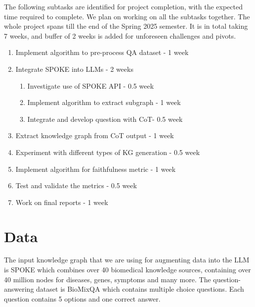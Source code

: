 \documentclass[11pt,a4paper]{article}
\begin{document}
The following subtasks are identified for project completion, with the expected time required to complete. We plan on working on all the subtasks together. The whole project spans till the end of the Spring 2025 semester. It is in total taking 7 weeks, and buffer of 2 weeks is added for unforeseen challenges and pivots. 
\begin{enumerate}
    \item Implement algorithm to pre-process QA dataset - 1 week
    \item Integrate SPOKE into LLMs - 2 weeks
    \begin{enumerate}
        \item Investigate use of SPOKE API - 0.5 week
        \item Implement algorithm to extract subgraph - 1 week
        \item Integrate and develop question with CoT- 0.5 week
    \end{enumerate}
    \item Extract knowledge graph from CoT output - 1 week
    \item Experiment with different types of KG generation - 0.5 week
    \item Implement algorithm for faithfulness metric - 1 week
    \item Test and validate the metrics - 0.5 week
    \item Work on final reports - 1 week
\end{enumerate}






\section{Data}
The input knowledge graph that we are using for augmenting data into the LLM is SPOKE which combines over 40 biomedical knowledge sources, containing over 40 million nodes for diseases, genes, symptoms and many more. The question-answering dataset is BioMixQA \cite{soman2024biomedicalknowledgegraphoptimizedprompt} which contains multiple choice questions. Each question contains 5 options and one correct answer.

\end{document}
